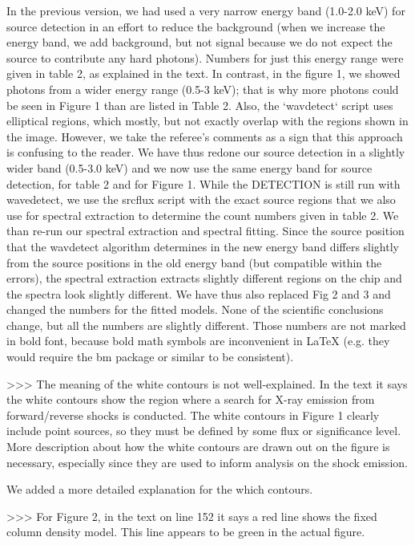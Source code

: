 In the previous version, we had used a very narrow energy band (1.0-2.0 keV) for source detection in an effort to reduce the background (when we increase the energy band, we add background, but not signal because we do not expect the source to contribute any hard photons). Numbers for just this energy range were given in table 2, as explained in the text. In contrast, in the figure 1, we showed photons from a wider energy range (0.5-3 keV); that is why more photons could be seen in Figure 1 than are listed in Table 2. Also, the `wavdetect` script uses elliptical regions, which mostly, but not exactly overlap with the regions shown in the image.
However, we take the referee's comments as a sign that this approach is confusing to the reader. We have thus redone our source detection in a slightly wider band (0.5-3.0 keV) and we now use the same energy band for source detection, for table 2 and for Figure 1. While the DETECTION is still run with wavedetect, we use the srcflux script with the exact source regions that we also use for spectral extraction to determine the count numbers given in table 2.
We than re-run our spectral extraction and spectral fitting. Since the source position that the wavdetect algorithm determines in the new energy band differs slightly from the source positions in the old energy band (but compatible within the errors), the spectral extraction extracts slightly different regions on the chip and the spectra look slightly different. We have thus also replaced Fig 2 and 3 and changed the numbers for the fitted models. 
None of the scientific conclusions change, but all the numbers are slightly different. Those numbers are not marked in bold font, because bold math symbols are inconvenient in LaTeX (e.g. they would require the bm package or similar to be consistent).

>>> The meaning of the white contours is not well-explained. In the text it says the white contours show the region where a search for X-ray emission from forward/reverse shocks is conducted. The white contours in Figure 1 clearly include point sources, so they must be defined by some flux or significance level. More description about how the white contours are drawn out on the figure is necessary, especially since they are used to inform analysis on the shock emission.

We added a more detailed explanation for the which contours.

>>> For Figure 2, in the text on line 152 it says a red line shows the fixed column density model. This line appears to be green in the actual figure.

